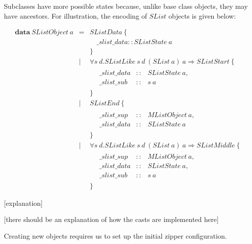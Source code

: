 \documentclass[runningheads,a4paper]{llncs}
\newcommand{\todo}[1]{[{\color{blue}#1}]}
\begin{document}
Subclasses have more possible states because, unlike base class objects, they may have ancestors. For illustration, the encoding of $\mathit{SList}$ objects is given below:

\begin{displaymath}
\begin{array}{lcl}
\mathbf{data}~\mathit{SListObject}~a & = & \mathit{SListData}~\{ \\ 
 & & \quad \_\mathit{slist}\_\mathit{data} :: \mathit{SListState}~a\\
 & & \} \\
 & \mid & \forall s~d.\mathit{SListLike}~s~d~(\mathit{SList}~a)~a \Rightarrow \mathit{SListStart}~\{\\
 & & \quad \begin{array}{lcl}
 \_\mathit{slist}\_\mathit{data} & :: & \mathit{SListState}~a, \\
 \_\mathit{slist}\_\mathit{sub}  & :: & s~a
 \end{array}\\
 & & \} \\
 & \mid & \mathit{SListEnd}~\{\\
  & & \quad \begin{array}{lcl}
  \_\mathit{slist}\_\mathit{sup}  & :: & \mathit{MListObject}~a, \\
  \_\mathit{slist}\_\mathit{data} & :: & \mathit{SListState}~a
  \end{array}\\
  & & \} \\
  & \mid & \forall s~d.\mathit{SListLike}~s~d~(\mathit{SList}~a)~a \Rightarrow \mathit{SListMiddle}~\{\\
   & & \quad \begin{array}{lcl}
   \_\mathit{slist}\_\mathit{sup}  & :: & \mathit{MListObject}~a, \\
   \_\mathit{slist}\_\mathit{data} & :: & \mathit{SListState}~a, \\
   \_\mathit{slist}\_\mathit{sub}  & :: & s~a
   \end{array}\\
   & & \}
\end{array}
\end{displaymath}

\todo{explanation}

\todo{there should be an explanation of how the casts are implemented here}

Creating new objects requires us to set up the initial zipper configuration.
\end{document}
